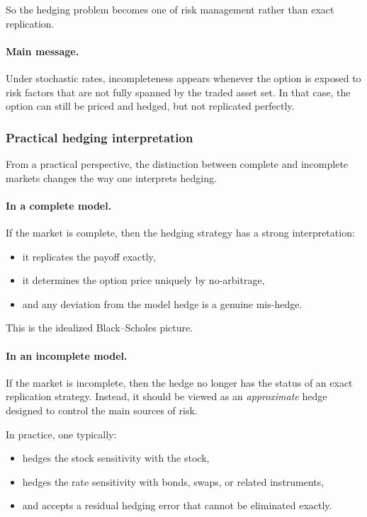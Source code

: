 \documentclass[11pt]{article}
\theoremstyle{plain}
\theoremstyle{definition}
\theoremstyle{remark}
\begin{document}
So the hedging problem becomes one of risk management rather than exact
replication.

\paragraph{Main message.}
Under stochastic rates, incompleteness appears whenever the option is
exposed to risk factors that are not fully spanned by the traded asset
set.
In that case, the option can still be priced and hedged, but not
replicated perfectly.

\subsubsection{Practical hedging interpretation}

From a practical perspective, the distinction between complete and
incomplete markets changes the way one interprets hedging.

\paragraph{In a complete model.}
If the market is complete, then the hedging strategy has a strong
interpretation:
\begin{itemize}[leftmargin=1.4em]
    \item it replicates the payoff exactly,
    \item it determines the option price uniquely by no-arbitrage,
    \item and any deviation from the model hedge is a genuine
    mis-hedge.
\end{itemize}

This is the idealized Black--Scholes picture.

\paragraph{In an incomplete model.}
If the market is incomplete, then the hedge no longer has the status of
an exact replication strategy.
Instead, it should be viewed as an \emph{approximate} hedge designed to
control the main sources of risk.

In practice, one typically:
\begin{itemize}[leftmargin=1.4em]
    \item hedges the stock sensitivity with the stock,
    \item hedges the rate sensitivity with bonds, swaps, or related
    instruments,
    \item and accepts a residual hedging error that cannot be eliminated
    exactly.
\end{itemize}
\end{document}

